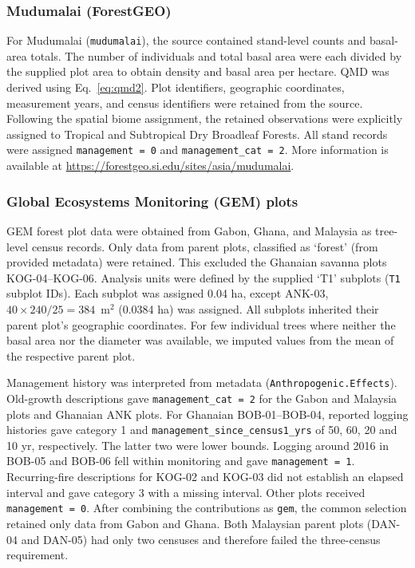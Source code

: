 \documentclass{myreport}
\begin{document}
% 

\subsubsection{Mudumalai (ForestGEO)}
For Mudumalai (\texttt{mudumalai}), the source contained stand-level counts and basal-area totals. The number of individuals and total basal area were each divided by the supplied plot area to obtain density and basal area per hectare. QMD was derived using Eq.~\ref{eq:qmd2}. Plot identifiers, geographic coordinates, measurement years, and census identifiers were retained from the source. Following the spatial biome assignment, the retained observations were explicitly assigned to Tropical and Subtropical Dry Broadleaf Forests. All stand records were assigned \texttt{management = 0} and \texttt{management\_cat = 2}. More information is available at \url{https://forestgeo.si.edu/sites/asia/mudumalai}.

% 

\subsubsection{Global Ecosystems Monitoring (GEM) plots}
\label{sec:gem}
GEM forest plot data were obtained from Gabon, Ghana, and Malaysia as tree-level census records. Only data from parent plots, classified as `forest' (from provided metadata) were retained. This excluded the Ghanaian savanna plots KOG-04--KOG-06. Analysis units were defined by the supplied `T1' subplots (\texttt{T1} subplot IDs). Each subplot was assigned 0.04 ha, except ANK-03, $40\times240/25=384$~m$^2$ (0.0384 ha) was assigned. All subplots inherited their parent plot's geographic coordinates. For few individual trees where neither the basal area nor the diameter was available, we imputed values from the mean of the respective parent plot.

Management history was interpreted from metadata (\texttt{Anthropogenic.Effects}). Old-growth descriptions gave \texttt{management\_cat = 2} for the Gabon and Malaysia plots and Ghanaian ANK plots. For Ghanaian BOB-01--BOB-04, reported logging histories gave category 1 and \texttt{management\_since\_census1\_yrs} of 50, 60, 20 and 10 yr, respectively. The latter two were lower bounds. Logging around 2016 in BOB-05 and BOB-06 fell within monitoring and gave \texttt{management = 1}. Recurring-fire descriptions for KOG-02 and KOG-03 did not establish an elapsed interval and gave category 3 with a missing interval. Other plots received \texttt{management = 0}. After combining the contributions as \texttt{gem}, the common selection retained only data from Gabon and Ghana. Both Malaysian parent plots (DAN-04 and DAN-05) had only two censuses and therefore failed the three-census requirement.
\end{document}
